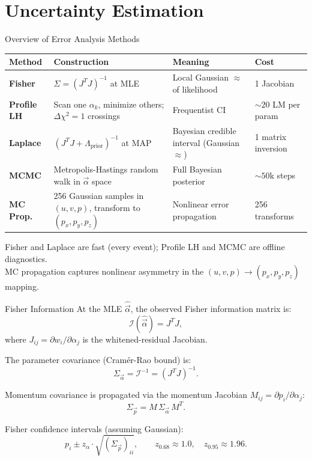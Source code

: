 \documentclass[aspectratio=169]{beamer}
\begin{document}
\section{Uncertainty Estimation}

\begin{frame}{Overview of Error Analysis Methods}
\small
\begin{table}
\centering
\begin{tabular}{p{}p{}p{}p{}}
\toprule
Method & Construction & Meaning & Cost \\
\midrule
\textbf{Fisher} & $\Sigma = (J^TJ)^{-1}$ at MLE & Local Gaussian $\approx$ of likelihood & 1 Jacobian \\
\textbf{Profile LH} & Scan one $\alpha_k$, minimize others; $\Delta\chi^2 = 1$ crossings & Frequentist CI & $\sim\!20$ LM per param \\
\textbf{Laplace} & $(J^TJ + \Lambda_\mathrm{prior})^{-1}$ at MAP & Bayesian credible interval (Gaussian $\approx$) & 1 matrix inversion \\
\textbf{MCMC} & Metropolis-Hastings random walk in $\vec{\alpha}$ space & Full Bayesian posterior & $\sim\!50$k steps \\
\textbf{MC Prop.} & 256 Gaussian samples in $(u,v,p)$, transform to $(p_x,p_y,p_z)$ & Nonlinear error propagation & 256 transforms \\
\bottomrule
\end{tabular}
\end{table}

\vspace{0.1cm}
Fisher and Laplace are fast (every event); Profile LH and MCMC are offline diagnostics.\\
MC propagation captures nonlinear asymmetry in the $(u,v,p) \to (p_x,p_y,p_z)$ mapping.
\end{frame}

\begin{frame}{Fisher Information}
\small
At the MLE $\hat{\vec{\alpha}}$, the observed Fisher information matrix is:
\[
\mathcal{I}(\hat{\vec{\alpha}}) = J^T J,
\]
where $J_{ij} = \partial w_i / \partial \alpha_j$ is the whitened-residual Jacobian.

The parameter covariance (Cram\'{e}r-Rao bound) is:
\[
\Sigma_{\vec{\alpha}} = \mathcal{I}^{-1} = (J^T J)^{-1}.
\]

Momentum covariance is propagated via the momentum Jacobian $M_{ij} = \partial p_i / \partial \alpha_j$:
\[
\Sigma_{\vec{p}} = M \, \Sigma_{\vec{\alpha}} \, M^T.
\]

Fisher confidence intervals (assuming Gaussian):
\[
p_i \pm z_\alpha \cdot \sqrt{(\Sigma_{\vec{p}})_{ii}}, \qquad z_{0.68} \approx 1.0,\quad z_{0.95} \approx 1.96.
\]
\end{frame}
\end{document}
